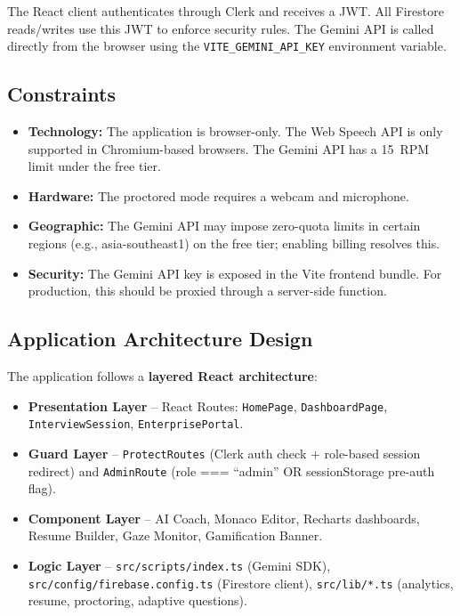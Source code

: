 \documentclass{fisatprojectfinal}
\begin{document}
The React client authenticates through Clerk and receives a JWT. All Firestore reads/writes
use this JWT to enforce security rules. The Gemini API is called directly from the browser
using the \texttt{VITE\_GEMINI\_API\_KEY} environment variable.

\subsection{Constraints}
\begin{itemize}
  \item \textbf{Technology:} The application is browser-only. The Web Speech API is only
        supported in Chromium-based browsers. The Gemini API has a 15~RPM limit under the
        free tier.
  \item \textbf{Hardware:} The proctored mode requires a webcam and microphone.
  \item \textbf{Geographic:} The Gemini API may impose zero-quota limits in certain regions
        (e.g., asia-southeast1) on the free tier; enabling billing resolves this.
  \item \textbf{Security:} The Gemini API key is exposed in the Vite frontend bundle. For
        production, this should be proxied through a server-side function.
\end{itemize}

\subsection{Application Architecture Design}
The application follows a \textbf{layered React architecture}:
\begin{itemize}
  \item \textbf{Presentation Layer} -- React Routes: \texttt{HomePage},
        \texttt{DashboardPage}, \texttt{InterviewSession}, \texttt{EnterprisePortal}.
  \item \textbf{Guard Layer} -- \texttt{ProtectRoutes} (Clerk auth check + role-based
        session redirect) and \texttt{AdminRoute} (role === ``admin'' OR sessionStorage
        pre-auth flag).
  \item \textbf{Component Layer} -- AI Coach, Monaco Editor, Recharts dashboards, Resume
        Builder, Gaze Monitor, Gamification Banner.
  \item \textbf{Logic Layer} -- \texttt{src/scripts/index.ts} (Gemini SDK),
        \texttt{src/config/firebase.config.ts} (Firestore client),
        \texttt{src/lib/*.ts} (analytics, resume, proctoring, adaptive questions).
\end{itemize}
\end{document}
